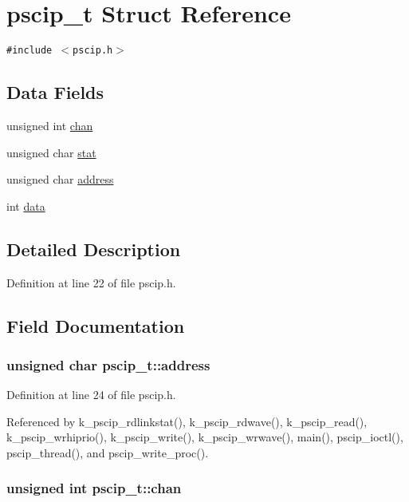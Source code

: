 \hypertarget{structpscip__t}{
\section{pscip\_\-t Struct Reference}
\label{structpscip__t}
}
{\tt \#include $<$pscip.h$>$}

\subsection*{Data Fields}
\begin{CompactItemize}
\item 
unsigned int \hyperlink{structpscip__t_8ee0b97dd5e2ac9fc6fbfaf5cdf0fba7}{chan}
\item 
unsigned char \hyperlink{structpscip__t_79235a96d6d6c52c0bb0dcc922947547}{stat}
\item 
unsigned char \hyperlink{structpscip__t_01955693eb0a6d5a3faae4585887f9e3}{address}
\item 
int \hyperlink{structpscip__t_d6ee430a30c9dc8e5ad006efcf5be07d}{data}
\end{CompactItemize}


\subsection{Detailed Description}


Definition at line 22 of file pscip.h.

\subsection{Field Documentation}
\hypertarget{structpscip__t_01955693eb0a6d5a3faae4585887f9e3}{
\subsubsection[{address}]{\setlength{\rightskip}{0pt plus 5cm}unsigned char {\bf pscip\_\-t::address}}}
\label{structpscip__t_01955693eb0a6d5a3faae4585887f9e3}




Definition at line 24 of file pscip.h.

Referenced by k\_\-pscip\_\-rdlinkstat(), k\_\-pscip\_\-rdwave(), k\_\-pscip\_\-read(), k\_\-pscip\_\-wrhiprio(), k\_\-pscip\_\-write(), k\_\-pscip\_\-wrwave(), main(), pscip\_\-ioctl(), pscip\_\-thread(), and pscip\_\-write\_\-proc().\hypertarget{structpscip__t_8ee0b97dd5e2ac9fc6fbfaf5cdf0fba7}{
\subsubsection[{chan}]{\setlength{\rightskip}{0pt plus 5cm}unsigned int {\bf pscip\_\-t::chan}}}
\label{structpscip__t_8ee0b97dd5e2ac9fc6fbfaf5cdf0fba7}




